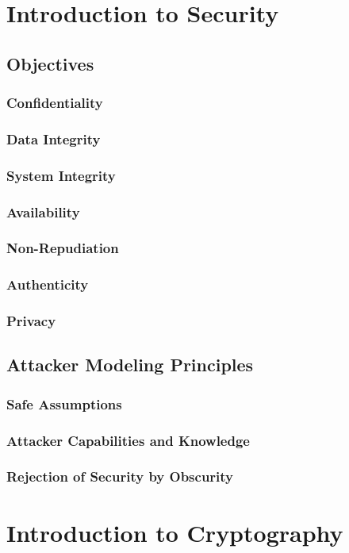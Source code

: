 \documentclass{article}
\begin{document}
\section{Introduction to Security}
\subsection{Objectives}
\subsubsection{Confidentiality}
\subsubsection{Data Integrity}
\subsubsection{System Integrity}
\subsubsection{Availability}
\subsubsection{Non-Repudiation}
\subsubsection{Authenticity}
\subsubsection{Privacy}
\subsection{Attacker Modeling Principles}
\subsubsection{Safe Assumptions}
\subsubsection{Attacker Capabilities and Knowledge}
\subsubsection{Rejection of Security by Obscurity}

\section{Introduction to Cryptography}
\end{document}
